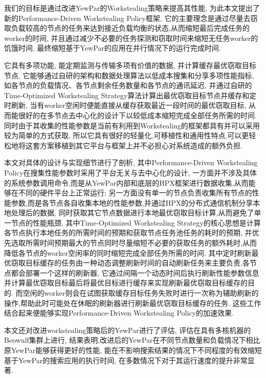 \documentclass{mproj}
\begin{document}
我们的目标是通过改进YewPar的Workstealing策略来提高其性能,
为此本文提出了新的Performance-Driven Workstealing Policy框架,
它的主要理念是通过尽量去窃取负载较高的节点的任务来达到接近负载均衡的状态,从而缩短最后完成任务的worker的时间,
并且通过减少不必要的任务探测和窃取时间来缩短无任务worker的饥饿时间,
最终缩短基于YewPar的应用在并行情况下的运行完成时间.

它具有多项功能,
能定期监测与传输多项有价值的数据,
并计算缓存最优窃取目标节点,
它能够通过自研的架构和数据处理算法以低成本搜集和分享多项性能指标,
如各节点的负载情况、各节点剩余任务数量和各节点的通讯延迟,
并通过自研的Time-Optimized Workstealing Strategy算法计算出最优窃取目标节点并缓存和定时刷新,
当有worker空闲时便能直接从缓存获取最近一段时间的最优窃取目标,
从而能很好的在多节点去中心化的设计下以较低成本缩短完成全部任务所需的时间.
同时由于其收集的性能参数是当前有利用到Workstealing的框架都具有并可以采用较为简单的方式获取,
所以它具有很好的轻量化,可移植性和通用性特点,可以更轻松地将这套方案移植到其它平台与框架上并不必担心对系统造成的额外负担.

本文对具体的设计与实现细节进行了剖析,
其中Performance-Driven Workstealing Policy在搜集性能参数时采用了平台无关与去中心化的设计,
一方面并不涉及具体的系统参数调用命令,而是从YewPar内部和底层的HPX\cite{10.1145/2676870.2676883}框架进行数据收集,从而能够在不同的硬件平台上正常运行;
另一方面没有单一的节点负责收集所有节点的性能参数,而是各节点各自收集本地的性能参数,并通过HPX的分布式通信机制分享本地处理后的数据,
同时获取其它节点数据进行本地最优窃取目标计算,从而避免了单一节点的性能瓶颈.
其中Time-Optimized Workstealing Strategy的核心思想是计算各节点执行本地任务的所需时间的预期和获取节点任务池任务的耗时的预期,
并优先选取所需时间预期最大的节点同时尽量缩短不必要的获取任务的额外耗时,从而降低各节点的worker空闲率的同时缩短完成全部任务所需的时间.
其中定时刷新最优窃取目标缓存的任务由一种动态调整刷新时间的自动刷新任务来主要负责,各节点都会部署一个这样的刷新器,
它通过间隔一个动态时间后执行刷新性能参数信息并计算最优窃取目标最后将最优目标进行缓存来实现刷新最优窃取目标缓存的目的.
而空闲的worker则会在试图获取缓存目标任务失败时进行一次称为辅助刷新的操作,帮助此时可能处在休眠的刷新器进行刷新最优窃取目标缓存的任务.
这些工作结合起来便能够实现Performance-Driven Workstealing Policy的加速效果.

本文还对改进workstealing策略后的YewPar进行了评估,
评估在具有多核机器的Beowulf集群上进行,
结果表明,改进后的YewPar在不同节点数量和负载情况下相比原YewPar能够获得更好的性能,
能在不影响搜索结果的情况下不同程度的有效缩短基于YewPar的搜索应用的执行时间,
在多数情况下对于其运行速度的提升非常显著.
\end{document}

